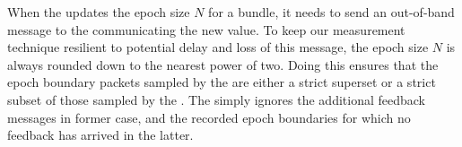 

When the \inbox updates the epoch size $N$ for a bundle, it needs to send an out-of-band message to the \outbox communicating the new value. To keep our measurement technique resilient to potential delay and loss of this message, the epoch size $N$ is always rounded down to the nearest power of two. Doing this ensures that the epoch boundary packets sampled by the \outbox are either a strict superset or a strict subset of those sampled by the \inbox. The \inbox simply ignores the additional feedback messages in former case, and the recorded epoch boundaries for which no feedback has arrived in the latter.  





